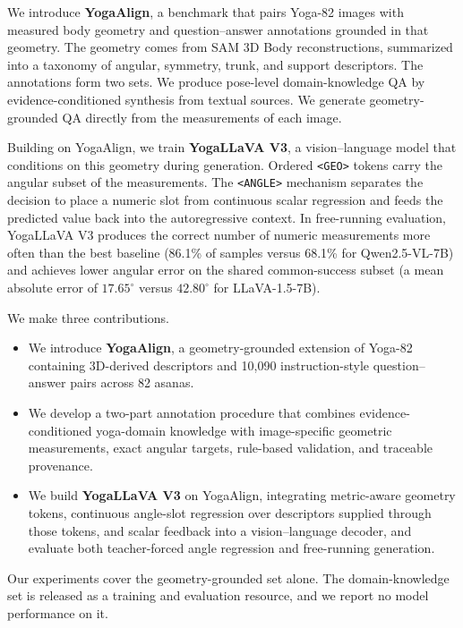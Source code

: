 We introduce \textbf{YogaAlign}, a benchmark that pairs Yoga-82 images with measured body geometry and question--answer annotations grounded in that geometry.
The geometry comes from SAM 3D Body reconstructions, summarized into a taxonomy of angular, symmetry, trunk, and support descriptors.
The annotations form two sets.
We produce pose-level domain-knowledge QA by evidence-conditioned synthesis from textual sources.
We generate geometry-grounded QA directly from the measurements of each image.

Building on YogaAlign, we train \textbf{YogaLLaVA V3}, a vision--language model that conditions on this geometry during generation.
Ordered \texttt{<GEO>} tokens carry the angular subset of the measurements.
The \texttt{<ANGLE>} mechanism separates the decision to place a numeric slot from continuous scalar regression and feeds the predicted value back into the autoregressive context.
In free-running evaluation, YogaLLaVA V3 produces the correct number of numeric measurements more often than the best baseline (86.1\% of samples versus 68.1\% for Qwen2.5-VL-7B) and achieves lower angular error on the shared common-success subset (a mean absolute error of $17.65^\circ$ versus $42.80^\circ$ for LLaVA-1.5-7B).

We make three contributions.
\begin{itemize}[leftmargin=1.2em,itemsep=2pt,topsep=3pt]
    \item We introduce \textbf{YogaAlign}, a geometry-grounded extension of Yoga-82 containing 3D-derived descriptors and 10,090 instruction-style question--answer pairs across 82 asanas.
    \item We develop a two-part annotation procedure that combines evidence-conditioned yoga-domain knowledge with image-specific geometric measurements, exact angular targets, rule-based validation, and traceable provenance.
    \item We build \textbf{YogaLLaVA V3} on YogaAlign, integrating metric-aware geometry tokens, continuous angle-slot regression over descriptors supplied through those tokens, and scalar feedback into a vision--language decoder, and evaluate both teacher-forced angle regression and free-running generation.
\end{itemize}
Our experiments cover the geometry-grounded set alone.
The domain-knowledge set is released as a training and evaluation resource, and we report no model performance on it.
